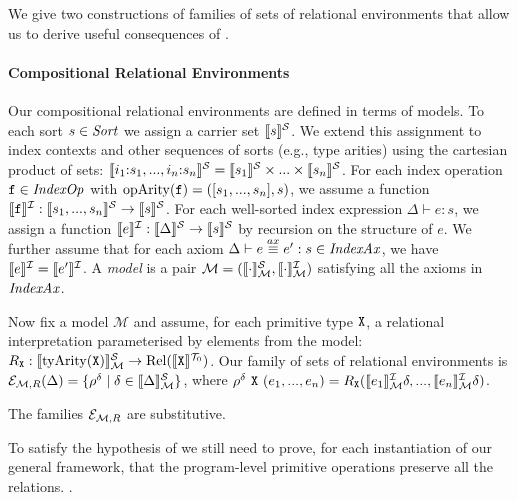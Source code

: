 We give two constructions of families of sets of relational
environments that allow us to derive useful consequences of
.

\paragraph{Compositional Relational Environments}
Our compositional relational environments are defined in terms of
models. To each sort $s \in \mathit{Sort}$ we assign a carrier set
$\llbracket s \rrbracket^{\mathcal{S}}$. We extend this assignment to index contexts and other
sequences of sorts (e.g., type arities) using the cartesian product of
sets: $\llbracket i_1\mathord:s_1,...,i_n\mathord:s_n \rrbracket^{\mathcal{S}} = \llbracket s_1 \rrbracket^{\mathcal{S}}
\times ... \times \llbracket s_n \rrbracket^{\mathcal{S}}$. For each index operation $\texttt{f}
\in \mathit{IndexOp}$ with $\mathrm{opArity}(\texttt{f}) = ([s_1,...,s_n],s)$,
we assume a function $\llbracket \texttt{f} \rrbracket^{\mathcal{I}} : \llbracket s_1,...,s_n \rrbracket^{\mathcal{S}}
\to \llbracket s \rrbracket^{\mathcal{S}}$. For each well-sorted index expression $\Delta \vdash
e : s$, we assign a function $\llbracket e \rrbracket^{\mathcal{I}} : \llbracket \Delta \rrbracket^{\mathcal{S}} \to
\llbracket s \rrbracket^{\mathcal{S}}$ by recursion on the structure of $e$. We further assume
that for each axiom $\Delta \vdash e \stackrel{ax}\equiv e' : s \in
\mathit{IndexAx}$, we have $\llbracket e \rrbracket^{\mathcal{I}} = \llbracket e' \rrbracket^{\mathcal{I}}$. A
\emph{model} is a pair $\mathcal{M} = (\llbracket \cdot \rrbracket^{\mathcal{S}}_{\mathcal{M}},
\llbracket \cdot \rrbracket^{\mathcal{I}}_{\mathcal{M}})$ satisfying all the axioms in
$\mathit{IndexAx}$.

Now fix a model $\mathcal{M}$ and assume, for each primitive type
$\textup{\texttt{X}}$, a relational interpretation parameterised by elements
from the model: $R_{\textup{\texttt{X}}} :
\llbracket \mathrm{tyArity}(\textup{\texttt{X}}) \rrbracket^{\mathcal{S}}_{\mathcal{M}} \to
\mathrm{Rel}(\llbracket \textup{\texttt{X}} \rrbracket^{\mathcal{T}_0})$. Our family of sets of relational
environments is $\mathcal{E}_{\mathcal{M},R}(\Delta) = \{ \rho^\delta
\mathrel| \delta \in \llbracket \Delta \rrbracket^{\mathcal{S}}_{\mathcal{M}} \}$, where
$\rho^\delta\ \textup{\texttt{X}}\ (e_1,...,e_n) =
R_{\textup{\texttt{X}}}(\llbracket e_1 \rrbracket^{\mathcal{I}}_{\mathcal{M}}\delta, ...,
\llbracket e_n \rrbracket^{\mathcal{I}}_{\mathcal{M}}\delta)$.

\begin{theorem}
  The families $\mathcal{E}_{\mathcal{M},R}$ are substitutive.
\end{theorem}

To satisfy the hypothesis of  we still need to
prove, for each instantiation of our general framework, that the
program-level primitive operations preserve all the relations.
.

